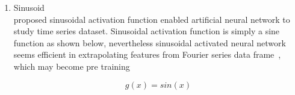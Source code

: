 \begin{enumerate}
\item Sinusoid \\
\citet{Gashler_2014} proposed sinusoidal activation function enabled artificial neural network to study time series dataset. Sinusoidal activation function is simply a sine function as shown below, nevertheless sinusoidal activated neural network seems efficient in extrapolating features from Fourier series data frame~\cite{Gashler_2014}, which may become pre training 

\begin{equation}
    g(x) = sin(x)
\end{equation}

\end{enumerate}